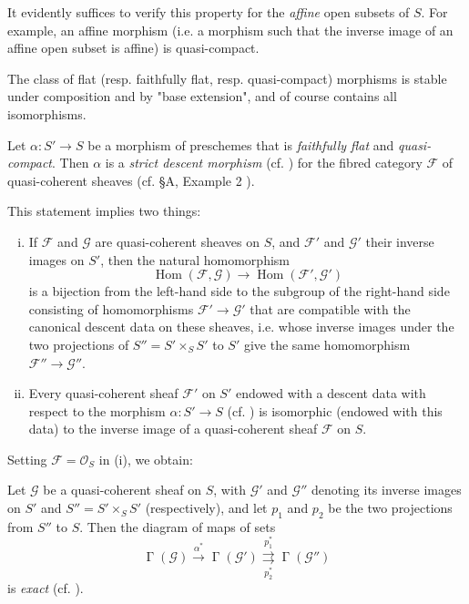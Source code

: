 It evidently suffices to verify this property for the \emph{affine} open subsets of $S$.
For example, an affine morphism (i.e. a morphism such that the inverse image of an affine open subset is affine) is quasi-compact.

The class of flat (resp. faithfully flat, resp. quasi-compact) morphisms is stable under composition and by "base extension", and of course contains all isomorphisms.

\begin{theorem}\label{fga3.i-b.1-theorem-1}
    Let $\alpha\colon S'\to S$ be a morphism of preschemes that is \emph{faithfully flat} and \emph{quasi-compact}.
    Then $\alpha$ is a \emph{strict descent morphism} (cf. ) for the fibred category $\mathcal{F}$ of quasi-coherent sheaves (cf. §A, Example 2 ).
\end{theorem}


This statement implies two things:

\begin{enumerate}[i.]
    \item If $\mathcal{F}$ and $\mathcal{G}$ are quasi-coherent sheaves on $S$, and $\mathcal{F}'$ and $\mathcal{G}'$ their inverse images on $S'$, then the natural homomorphism
          \[
              \operatorname{Hom}(\mathcal{F},\mathcal{G}) \to \operatorname{Hom}(\mathcal{F}',\mathcal{G}')
          \]
          is a bijection from the left-hand side to the subgroup of the right-hand side consisting of homomorphisms $\mathcal{F}'\to\mathcal{G}'$ that are compatible with the canonical descent data on these sheaves, i.e. whose inverse images under the two projections of $S''=S'\times_S S'$ to $S'$ give the same homomorphism $\mathcal{F}''\to\mathcal{G}''$.
    \item Every quasi-coherent sheaf $\mathcal{F}'$ on $S'$ endowed with a descent data with respect to the morphism $\alpha\colon S'\to S$ (cf. ) is isomorphic (endowed with this data) to the inverse image of a quasi-coherent sheaf $\mathcal{F}$ on $S$.
\end{enumerate}

Setting $\mathcal{F}=\mathcal{O}_S$ in (i), we obtain:

\begin{corollary}\label{fga3.i-b.1-corollary-1}
    Let $\mathcal{G}$ be a quasi-coherent sheaf on $S$, with $\mathcal{G}'$ and $\mathcal{G}''$ denoting its inverse images on $S'$ and $S''=S'\times_S S'$ (respectively), and let $p_1$ and $p_2$ be the two projections from $S''$ to $S$.
    Then the diagram of maps of sets
    \[
        \operatorname{\Gamma}(\mathcal{G}) \xrightarrow{\alpha^*}
        \operatorname{\Gamma}(\mathcal{G}') \overset{p_1^*}{\underset{p_2^*}{\rightrightarrows}}
        \operatorname{\Gamma}(\mathcal{G}'')
    \]
    is \emph{exact} (cf. ).
\end{corollary}


